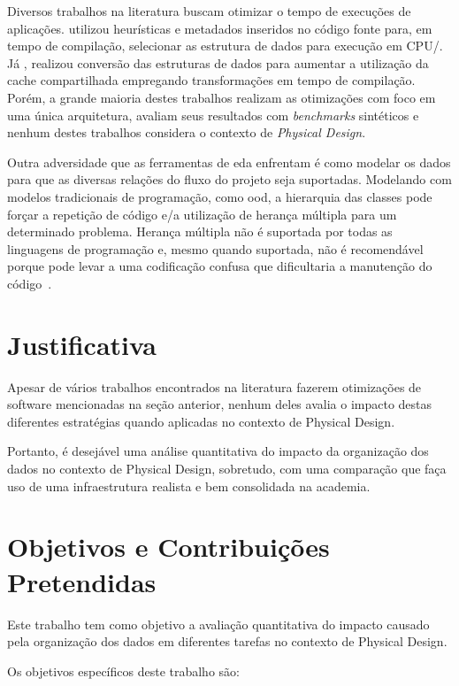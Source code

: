 Diversos trabalhos na literatura buscam otimizar o tempo de execuções de aplicações.
 utilizou heurísticas e metadados inseridos no código fonte para, em tempo de compilação, selecionar as estrutura de dados para execução em CPU\@/\@GPU.
Já , realizou conversão das estruturas de dados para aumentar a utilização da cache compartilhada empregando transformações em tempo de compilação.
Porém, a grande maioria destes trabalhos realizam as otimizações com foco em uma única arquitetura, avaliam seus resultados com \textit{benchmarks} sintéticos e nenhum destes trabalhos considera o contexto de \textit{Physical Design}.

Outra adversidade que as ferramentas de \ac{eda} enfrentam é como modelar os dados para que as diversas relações do fluxo do projeto seja suportadas.
Modelando com modelos tradicionais de programação, como \ac{ood}, a hierarquia das classes pode forçar a repetição de código e\@/\@ou a utilização de herança múltipla para um determinado problema.
Herança múltipla não é suportada por todas as linguagens de programação e, mesmo quando suportada, não é recomendável porque pode levar a uma codificação confusa que dificultaria a manutenção do código~\cite{nystrom2014game}.


\section{Justificativa}

    Apesar de vários trabalhos encontrados na literatura fazerem otimizações de software mencionadas na seção anterior, nenhum deles avalia o impacto destas diferentes estratégias quando aplicadas no contexto de Physical Design.

    Portanto, é desejável uma análise quantitativa do impacto da organização dos dados no contexto de Physical Design, sobretudo, com uma comparação que faça uso de uma infraestrutura realista e bem consolidada na academia.

\section{Objetivos e Contribuições Pretendidas}

    Este trabalho tem como objetivo a avaliação quantitativa do impacto causado pela organização dos dados em diferentes tarefas no contexto de Physical Design.

    Os objetivos específicos deste trabalho são:

